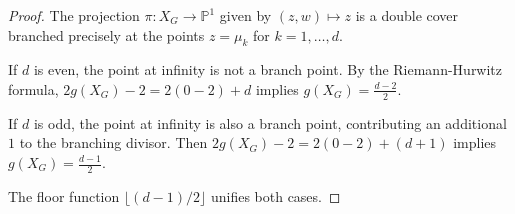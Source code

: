 \documentclass[10pt,a4paper]{amsart}
\newcommand{\PP}{\mathbb{P}}
\begin{document}
\begin{proof}
The projection $\pi: X_G \to \PP^1$ given by $(z,w) \mapsto z$ is a double cover branched precisely at the points $z = \mu_k$ for $k = 1,\dots,d$.

If $d$ is even, the point at infinity is not a branch point. By the Riemann-Hurwitz formula,
$2g(X_G) - 2 = 2(0 - 2) + d$ implies $g(X_G) = \frac{d-2}{2}$.

If $d$ is odd, the point at infinity is also a branch point, contributing an additional $1$ to the branching divisor. Then
$2g(X_G) - 2 = 2(0 - 2) + (d + 1)$ implies $g(X_G) = \frac{d-1}{2}$.

The floor function $\lfloor (d-1)/2 \rfloor$ unifies both cases.
\end{proof}
\end{document}
